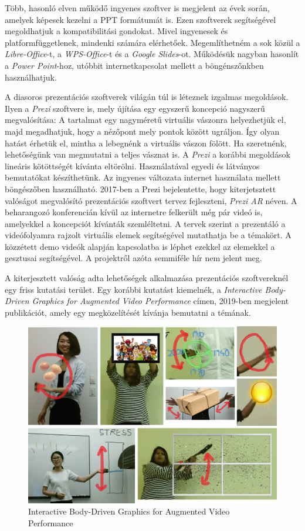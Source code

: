 Több, hasonló elven működő ingyenes szoftver is megjelent az évek során, amelyek képesek kezelni a PPT formátumát is. Ezen szoftverek segítségével megoldhatjuk a kompatibilitási gondokat. Mivel ingyenesek és platformfüggetlenek, mindenki számára elérhetőek. Megemlíthetném a sok közül a \textit{Libre-Office}-t, a \textit{WPS-Office}-t és a \textit{Google Slides}-ot. Működésük nagyban hasonlít a \textit{Power Point}-hoz, utóbbit internetkapcsolat mellett a böngénszőnkben használhatjuk.

A diasoros prezentációs szoftverek világán túl is léteznek izgalmas megoldások. 
Ilyen a \textit{Prezi} szoftvere is, mely újítása egy egyszerű koncepció nagyszerű megvalósítása: A tartalmat egy nagyméretű virtuális vászonra helyezhetjük el, majd megadhatjuk, hogy a nézőpont mely pontok között ugráljon. Így olyan hatást érhetük el, mintha a lebegnénk a virtuális vászon fölött. Ha szeretnénk, lehetőségünk van megmutatni a teljes vásznat is. A \textit{Prezi} a korábbi megoldások lineáris kötöttségét kívánta eltörölni. Használatával egyedi és látványos bemutatókat készíthetünk. Az ingyenes változata internet használata mellett böngészőben használható.
2017-ben a Prezi bejelentette, hogy kiterjetsztett valóságot megvalósító prezentációs szoftvert tervez fejleszteni, \textit{Prezi AR} néven. A beharangozó konferencián kívül az internetre felkerült még pár videó is, amelyekkel a koncepciót kívánták szemléltetni. A tervek szerint a prezentáló a videófolyamra rajzolt virtuális elemek segítségével mutathatja be a témakört. A közzétett demo videók alapján kapcsolatba is léphet ezekkel az elemekkel a gesztusai segítségével. A projektről azóta semmiféle hír nem jelent meg.

A kiterjesztett valóság adta lehetőségek alkalmazása prezentációs szoftvereknél egy friss kutatási terület. Egy korábbi kutatást kiemelnék, a \textit{Interactive Body-Driven Graphics for Augmented Video Performance} címen, 2019-ben megjelent publikációt, amely egy megközelítését kívánja bemutatni a témának. \cite{saquib2019interactive}

\begin{figure}[h]
\centering
\includegraphics[width=10truecm, height=7.14truecm]{images/IBDGAVP.png}
\caption{Interactive Body-Driven Graphics for Augmented Video Performance}
\label{fig:ibdgavp}
\end{figure}

